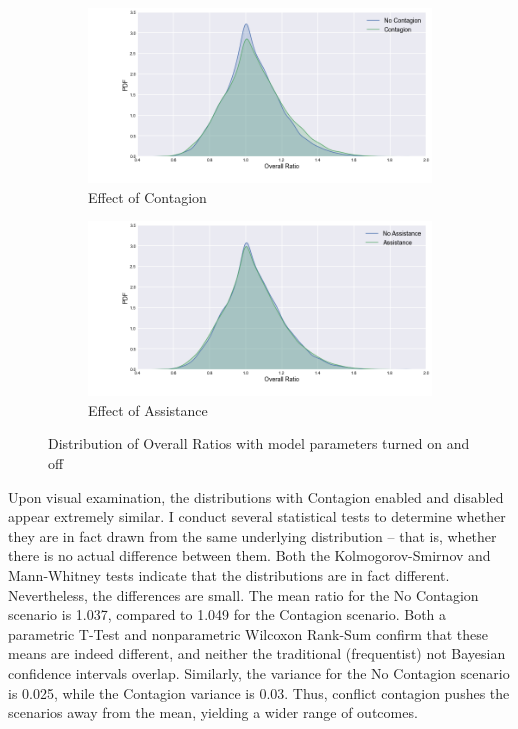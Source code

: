 \documentclass{article}
\begin{document}
\begin{figure}[h!]
	\centering
	\begin{subfigure}{\textwidth}
		\includegraphics[width=\textwidth]{../Graphics/ContagionDistribution}
		\caption{Effect of Contagion}
	\end{subfigure}

	\begin{subfigure}{\textwidth}
		\includegraphics[width=\textwidth]{../Graphics/AssistanceDistribution}
		\caption{Effect of Assistance}
	\end{subfigure}

	\caption{Distribution of Overall Ratios with model parameters turned on and off}
\end{figure}

Upon visual examination, the distributions with Contagion enabled and disabled appear extremely similar. I conduct several statistical tests to determine whether they are in fact drawn from the same underlying distribution -- that is, whether there is no actual difference between them. Both the Kolmogorov-Smirnov  and Mann-Whitney tests indicate that the distributions are in fact different. Nevertheless, the differences are small. The mean ratio for the No Contagion scenario is 1.037, compared to 1.049 for the Contagion scenario. Both a parametric T-Test and nonparametric Wilcoxon Rank-Sum confirm that these means are indeed different, and neither the traditional (frequentist) not Bayesian confidence intervals overlap. Similarly, the variance for the No Contagion scenario is 0.025, while the Contagion variance is 0.03. Thus, conflict contagion pushes the scenarios away from the mean, yielding a wider range of outcomes. 
\end{document}
